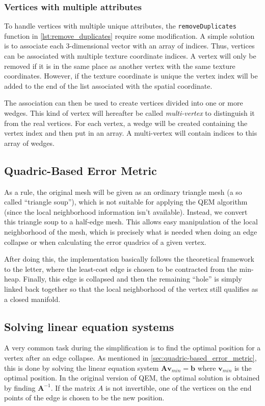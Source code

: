 \begin{subs}
\subsubsection{Vertices with multiple attributes}
To handle vertices with multiple unique attributes, the \texttt{removeDuplicates} function in \cref{lst:remove_duplicates} require some modification. A simple solution is to associate each 3-dimensional vector with an array of indices. Thus, vertices can be associated with multiple texture coordinate indices. A vertex will only be removed if it is in the same place as another vertex with the same texture coordinates. However, if the texture coordinate is unique the vertex index will be added to the end of the list associated with the spatial coordinate.

The association can then be used to create vertices divided into one or more wedges. This kind of vertex will hereafter be called \emph{multi-vertex} to distinguish it from the real vertices. For each vertex, a wedge will be created containing the vertex index and then put in an array. A multi-vertex will contain indices to this array of wedges. 
\end{subs}

\subsection{Quadric-Based Error Metric} \label{sec:quadric-based_error_metric2}
As a rule, the original mesh will be given as an ordinary triangle mesh (a so called ``triangle soup''), which is not suitable for applying the QEM algorithm (since the local neighborhood information isn't available). Instead, we convert this triangle soup to a half-edge mesh. This allows easy manipulation of the local neighborhood of the mesh, which is precisely what is needed when doing an edge collapse or when calculating the error quadrics of a given vertex.

After doing this, the implementation basically follows the theoretical framework to the letter, where the least-cost edge is chosen to be contracted from the min-heap. Finally, this edge is collapsed and then the remaining ``hole'' is simply linked back together so that the local neighborhood of the vertex still qualifies as a closed manifold.

\subsection{Solving linear equation systems}
A very common task during the simplification is to find the optimal position for a vertex after an edge collapse. As mentioned in \cref{sec:quadric-based_error_metric}, this is done by solving the linear equation system \(\mathbf{A} \mathbf{v}_{min} = \mathbf{b}\) where \(\mathbf{v}_{min}\) is the optimal position. In the original version of QEM, the optimal solution is obtained by finding \(\mathbf{A}^{-1}\). If the matrix \(A\) is not invertible, one of the vertices on the end points of the edge is chosen to be the new position.

